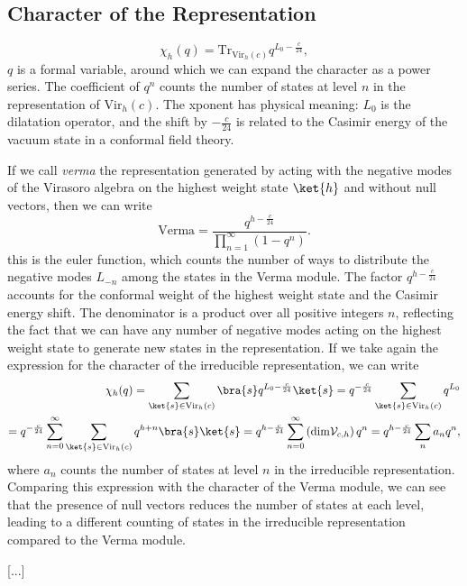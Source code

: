 \subsection{Character of the Representation}

\[
    \chi_h(q) = \text{Tr}_{\mathrm{Vir}_h(c)} q^{L_0 - \frac{c}{24}},
\]
\(q\) is a formal variable, around which we can expand the character as a power series. The coefficient of \(q^n\) counts the number of states at level \(n\) in the representation of \(\mathrm{Vir}_h(c)\). The xponent has physical meaning: \(L_0\) is the dilatation operator, and the shift by \(-\frac{c}{24}\) is related to the Casimir energy of the vacuum state in a conformal field theory.

If we call \textit{verma} the representation generated by acting with the negative modes of the Virasoro algebra on the highest weight state \(\ket{h}\) and without null vectors, then we can write
\[
    \mathrm{Verma} = \frac{q^{h - \frac{c}{24}}}{\prod_{n=1}^\infty (1 - q^n)}.
\]
this is the euler function, which counts the number of ways to distribute the negative modes \(L_{-n}\) among the states in the Verma module. The factor \(q^{h - \frac{c}{24}}\) accounts for the conformal weight of the highest weight state and the Casimir energy shift. The denominator is a product over all positive integers \(n\), reflecting the fact that we can have any number of negative modes acting on the highest weight state to generate new states in the representation. If we take again the expression for the character of the irreducible representation, we can write
\[
    \begin{aligned}
        \chi_h(q) = \sum_{\ket{s} \in \mathrm{Vir}_h(c)} \bra{s} q^{L_0 - \frac{c}{24}} \ket{s} = q^{-\frac{c}{24}}\sum_{\ket{s} \in \mathrm{Vir}_h(c)} q^{L_0} \\
        = q^{-\frac{c}{24}} \sum_{n=0}^\infty \sum_{\ket{s} \in \mathrm{Vir}_h(c)} q^{h+n}\bra{s} \ket{s} = q^{h - \frac{c}{24}} \sum_{n=0}^\infty \left( \mathrm{dim} \mathcal{V}_{c,h} \right) q^n = q^{h - \frac{c}{24}} \sum_{n} a_n q^n,
    \end{aligned}
\]
where \(a_n\) counts the number of states at level \(n\) in the irreducible representation. Comparing this expression with the character of the Verma module, we can see that the presence of null vectors reduces the number of states at each level, leading to a different counting of states in the irreducible representation compared to the Verma module.

    [...]


